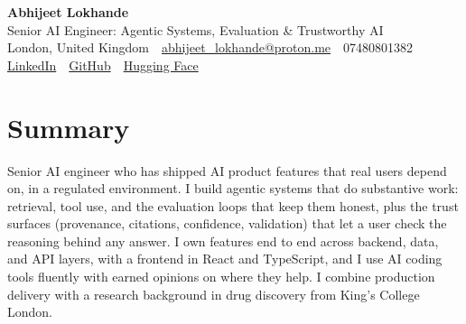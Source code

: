\documentclass[10pt,a4paper]{article}
\newcommand{\sep}{\,\textcolor{accent!60}{\textbar}\,}
\begin{document}
\begin{center}
  {\fontsize{24}{26}\selectfont\bfseries Abhijeet Lokhande}\\[3pt]
  {\color{accent}\large Senior AI Engineer: Agentic Systems, Evaluation \& Trustworthy AI}\\[5pt]
  {\small
    London, United Kingdom \sep
    \href{mailto:abhijeet_lokhande@proton.me}{abhijeet\_lokhande@proton.me} \sep
    07480801382 \\[2pt]
    \href{https://www.linkedin.com/in/ablds/}{LinkedIn} \sep
    \href{https://github.com/abhijeetscode}{GitHub} \sep
    \href{https://huggingface.co/ab-ai}{Hugging Face}
  }
\end{center}
\vspace{2pt}

\section{Summary}
Senior AI engineer who has shipped AI product features that real users depend on, in a regulated environment. I build agentic systems that do substantive work: retrieval, tool use, and the evaluation loops that keep them honest, plus the trust surfaces (provenance, citations, confidence, validation) that let a user check the reasoning behind any answer. I own features end to end across backend, data, and API layers, with a frontend in React and TypeScript, and I use AI coding tools fluently with earned opinions on where they help. I combine production delivery with a research background in drug discovery from King's College London.

\end{document}
